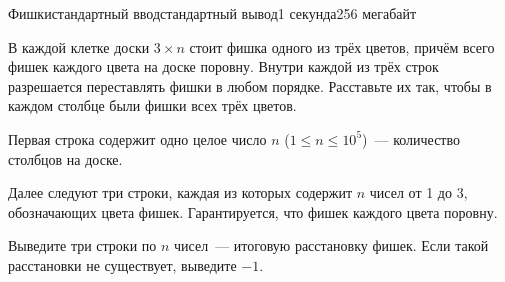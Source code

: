 \begin{problem}{Фишки}{стандартный ввод}{стандартный вывод}{1 секунда}{256 мегабайт}

В каждой клетке доски $3\times n$ стоит фишка одного из трёх цветов, причём всего фишек каждого цвета на доске поровну. Внутри каждой из трёх строк разрешается переставлять фишки в любом порядке. Расставьте их так, чтобы в каждом столбце были фишки всех трёх цветов.

\InputFile
Первая строка содержит одно целое число $n$ ($1\le n\le 10^5$)~--- количество столбцов на доске.

Далее следуют три строки, каждая из которых содержит $n$ чисел от 1 до 3, обозначающих цвета фишек. Гарантируется, что фишек каждого цвета поровну.

\OutputFile
Выведите три строки по $n$ чисел~--- итоговую расстановку фишек. Если такой расстановки не существует, выведите $-1$.

\Example

\begin{example}
%
\end{example}

\end{problem}

